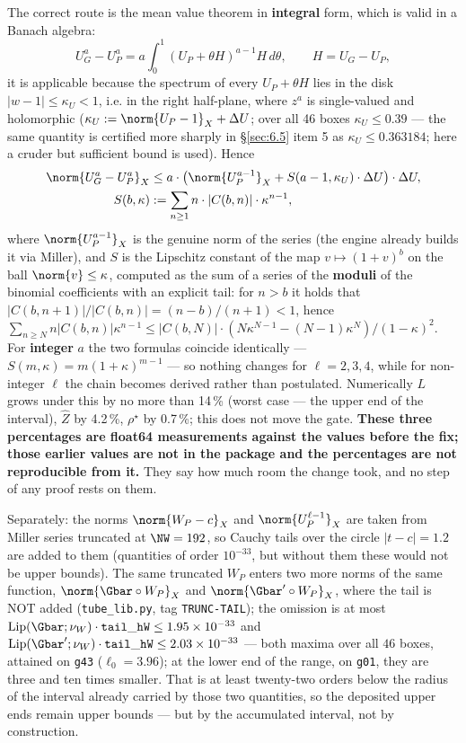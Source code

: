 The correct route is the mean value theorem in \textbf{integral} form, which is valid in a Banach algebra:
\[ U_{G}^{a} - U_{P}^{a} = a \int_{0}^{1} (U_{P} + \theta H)^{a-1} H \,d\theta, \qquad H = U_{G} - U_{P}, \]
it is applicable because the spectrum of every $U_{P} + \theta H$ lies in the disk $|w - 1| \le \kappa_{U} < 1$, i.e. in the right half-plane, where $z^{a}$ is single-valued and holomorphic ($\kappa_{U} := \norm{U_{P} - 1}_{X} + \Delta U$; over all 46 boxes $\kappa_{U} \le 0.39$ --- the same quantity is certified more sharply in \S\ref{sec:6.5} item 5 as $\kappa_{U} \le 0.363184$; here a cruder but sufficient bound is used).
Hence
\begin{align*}
\norm{U_{G}^{a} - U_{P}^{a}}_{X} &\le a\cdot \bigl( \norm{U_{P}^{a-1}}_{X} + S(a-1, \kappa_{U})\cdot \Delta U \bigr)\cdot \Delta U, \\
S(b, \kappa) &:= \sum_{n\ge 1} n\cdot |C(b,n)|\cdot \kappa^{n-1},
\end{align*}
where $\norm{U_{P}^{a-1}}_{X}$ is the genuine norm of the series (the engine already builds it via Miller), and $S$ is the Lipschitz constant of the map $v \mapsto (1+v)^{b}$ on the ball $\norm{v} \le \kappa$, computed as the sum of a series of the \textbf{moduli} of the binomial coefficients with an explicit tail: for $n > b$ it holds that $|C(b,n+1)|/|C(b,n)| = (n-b)/(n+1) < 1$, hence $\sum_{n\ge N} n|C(b,n)|\kappa^{n-1} \le |C(b,N)|\cdot (N\kappa^{N-1} - (N-1)\kappa^{N})/(1-\kappa)^{2}$. For \textbf{integer} $a$ the two formulas coincide identically --- $S(m,\kappa) = m(1+\kappa)^{m-1}$ --- so nothing changes for $\ell = 2, 3, 4$, while for non-integer $\ell$ the chain becomes derived rather than postulated. Numerically $L$ grows under this by no more than 14\,\% (worst case --- the upper end of the interval), $\widehat{Z}$ by 4.2\,\%, $\rho^{\star}$ by 0.7\,\%; this does not move the gate.
\textbf{These three percentages are float64 measurements against the values
before the fix; those earlier values are not in the package and the
percentages are not reproducible from it.} They say how much room the change
took, and no step of any proof rests on them.

Separately: the norms $\norm{W_{P} - c}_{X}$ and $\norm{U_{P}^{\ell-1}}_{X}$ are taken from Miller series truncated at $\NW = 192$, so Cauchy tails over the circle $|t - c| = 1.2$ are added to them (quantities of order $10^{-33}$, but without them these would not be upper bounds). The same truncated $W_{P}$ enters two more norms of the same function, $\norm{\Gbar\circ W_{P}}_{X}$ and $\norm{\Gbar'\circ W_{P}}_{X}$, where the tail is NOT added (\texttt{tube\_\allowbreak lib.py}, tag \texttt{TRUNC-\allowbreak TAIL}); the omission is at most
$\mathrm{Lip}(\Gbar;\nu_W)\cdot\mathtt{tail\_hW}\le 1.95\times 10^{-33}$ and
$\mathrm{Lip}(\Gbar';\nu_W)\cdot\mathtt{tail\_hW}\le 2.03\times 10^{-33}$
--- both maxima over all $46$ boxes, attained on \texttt{g43} ($\ell_0=3.96$);
at the lower end of the range, on \texttt{g01}, they are three and ten times
smaller. That is at least twenty-two orders below the radius of the interval
already carried by those two quantities, so the deposited upper ends remain
upper bounds --- but by the accumulated interval, not by construction.


